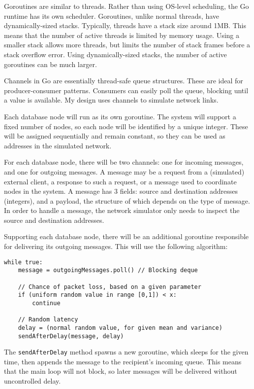 \documentclass[12pt,a4paper,twoside,openright]{report}
\begin{document}
Goroutines are similar to threads. Rather than using OS-level scheduling, the Go runtime has its own scheduler. Goroutines, unlike normal threads, have dynamically-sized stacks. Typically, threads have a stack size around 1MB. This means that the number of active threads is limited by memory usage. Using a smaller stack allows more threads, but limits the number of stack frames before a stack overflow error. Using dynamically-sized stacks, the number of active goroutines can be much larger.

Channels in Go are essentially thread-safe queue structures. These are ideal for producer-consumer patterns. Consumers can easily poll the queue, blocking until a value is available. My design uses channels to simulate network links.

Each database node will run as its own goroutine. The system will support a fixed number of nodes, so each node will be identified by a unique integer. These will be assigned sequentially and remain constant, so they can be used as addresses in the simulated network.

For each database node, there will be two channels: one for incoming messages, and one for outgoing messages. A message may be a request from a (simulated) external client, a response to such a request, or a message used to coordinate nodes in the system. A message has 3 fields: source and destination addresses (integers), and a payload, the structure of which depends on the type of message. In order to handle a message, the network simulator only needs to inspect the source and destination addresses.

Supporting each database node, there will be an additional goroutine responsible for delivering its outgoing messages. This will use the following algorithm:

\begin{lstlisting}
while true:
    message = outgoingMessages.poll() // Blocking deque

    // Chance of packet loss, based on a given parameter
    if (uniform random value in range [0,1]) < x:
        continue

    // Random latency
    delay = (normal random value, for given mean and variance)
    sendAfterDelay(message, delay)
\end{lstlisting}

The \verb|sendAfterDelay| method spawns a new goroutine, which sleeps for the given time, then appends the message to the recipient's incoming queue. This means that the main loop will not block, so later messages will be delivered without uncontrolled delay.
\end{document}
